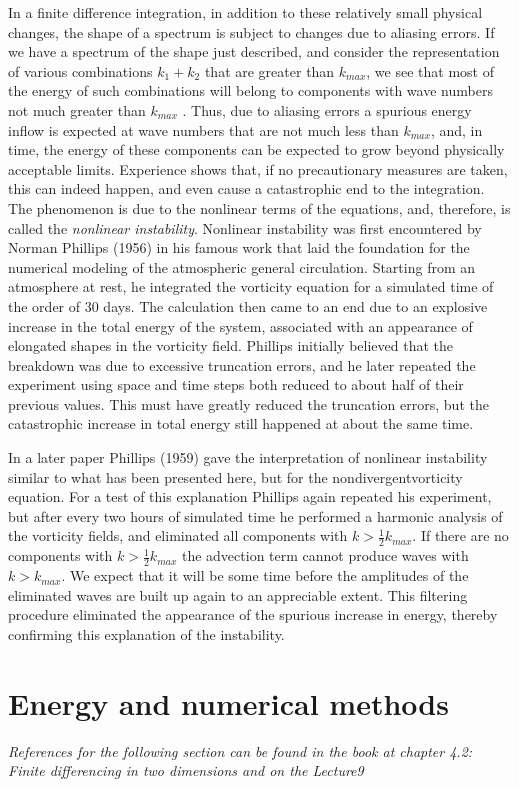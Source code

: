 In a finite difference integration, in addition to these relatively small physical changes, the shape of a spectrum is subject to changes due to aliasing errors. If we have a spectrum of the shape just described, and consider the representation of various combinations $k_1+k_2$ that are greater than $k_{max}$, we see that most of the energy of such combinations will belong to components with wave numbers not much greater than $k_{max}$ . Thus, due to aliasing errors a spurious energy inflow is expected at wave numbers that are not much less than $k_{max}$, and, in time, the energy of these components can be expected to grow beyond physically acceptable limits. Experience shows that, if no precautionary measures are taken, this can indeed happen, and even cause a catastrophic end to the integration. The phenomenon is due to the nonlinear terms of the equations, and, therefore, is called the \textit{nonlinear instability}. Nonlinear instability was first encountered by Norman Phillips (1956) in his famous work that laid the foundation for the numerical modeling of the atmospheric general circulation. Starting from an atmosphere at rest, he integrated the vorticity equation for a simulated time of the order of 30 days. The calculation then came to an end due to an explosive increase in the total energy of the system, associated with an appearance of elongated shapes in the vorticity field. Phillips initially believed that the breakdown was due to excessive truncation errors, and he later repeated the experiment using space and time steps both reduced to about half of their previous values. This must have greatly reduced the truncation errors, but the catastrophic increase in total energy still happened at about the same time.

In a later paper Phillips (1959) gave the interpretation of nonlinear instability similar to what has been presented here, but for the nondivergentvorticity equation. For a test of this explanation Phillips again repeated his experiment, but after every two hours of simulated time he performed a harmonic analysis of the vorticity fields, and eliminated all components with $k>\frac{1}{2}k_{max}$. If there are no components with $k>\frac{1}{2}k_{max}$ the advection term cannot produce waves with $k>k_{max}$. We expect that it will be some time before the amplitudes of the eliminated waves are built up again to an appreciable extent. This filtering procedure eliminated the appearance of the spurious increase in energy, thereby confirming this explanation of the instability.
\section{Energy and numerical methods}\label{sec:en and numerical methods}
\begin{center}
    \textit{References for the following section can be found in the book at chapter 4.2: Finite differencing in two dimensions and on the Lecture9}
\end{center}

